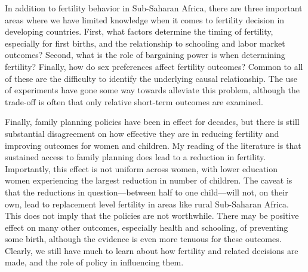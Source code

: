 \documentclass[letterpaper,12pt]{article}
\begin{document}
In addition to fertility behavior in Sub-Saharan Africa, 
there are three important areas where we have limited knowledge
when it comes to fertility decision in developing countries.
First, what factors determine the timing of fertility, especially
for first births, and the relationship to schooling and labor
market outcomes?
Second, what is the role of bargaining power is when determining
fertility?
Finally, how do sex preferences affect fertility outcomes?
Common to all of these are the difficulty to identify the
underlying causal relationship.
The use of experiments have gone some way towards alleviate
this problem, although the trade-off is often that only
relative short-term outcomes are examined. 

Finally, family planning policies have been in effect for
decades, but there is still substantial disagreement on
how effective they are in reducing fertility and improving
outcomes for women and children.
My reading of the literature is that sustained access to
family planning does lead to a reduction in fertility.
Importantly, this effect is not uniform across women, with
lower education women experiencing the largest reduction
in number of children.
The caveat is that the reductions in question---between
half to one child---will not, on their own, lead to
replacement level fertility in areas like rural
Sub-Saharan Africa.
This does not imply that the policies are not worthwhile.
There may be positive effect on many other outcomes,
especially health and schooling, of preventing some
birth, although the evidence is even more tenuous for
these outcomes.
Clearly, we still have much to learn about how 
fertility and related decisions are made, and the role
of policy in influencing them.





\end{document}
